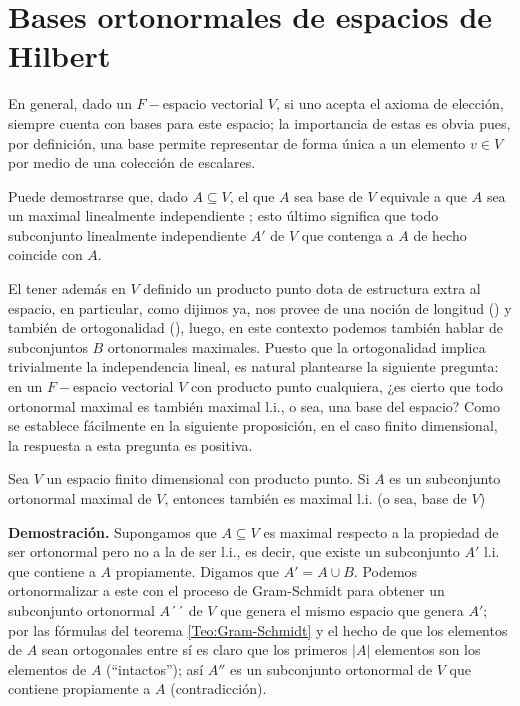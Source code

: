 \section{Bases ortonormales de espacios de Hilbert}





En general, dado un $F-$espacio vectorial $V$,
si uno acepta el axioma de elección, siempre cuenta con 
bases para este espacio; la importancia de 
estas es obvia pues, por definición, una base permite representar
de forma única a un elemento $v \in V$ por medio
de una colección de escalares. 


Puede demostrarse
que, dado $A \subseteq V$, el que $A$ sea base de $V$
equivale a que $A$ sea un maximal linealmente
independiente ; esto último significa
que todo subconjunto  linealmente
independiente $A'$ de $V$ que contenga
a $A$ de hecho coincide con $A$.

El tener además en $V$ definido un producto punto
dota de estructura extra al espacio, en particular, 
como dijimos ya,
nos provee de una noción de longitud () y también 
de ortogonalidad (), luego, en este 
contexto podemos también hablar de subconjuntos $B$
ortonormales maximales. Puesto que la ortogonalidad implica
trivialmente la independencia lineal, es natural plantearse
la siguiente pregunta: en un $F-$espacio vectorial $V$
con producto punto
cualquiera, ¿es cierto que todo ortonormal maximal es también
maximal l.i., o sea, una base
del espacio? Como se establece 
fácilmente en la siguiente proposición,
en el caso finito dimensional, la respuesta a esta
pregunta es positiva.

\begin{prop}
Sea $V$ un espacio finito dimensional
con producto punto. Si $A$
es un subconjunto ortonormal maximal de $V$, entonces
también es maximal l.i. (o sea, base de $V$)
\end{prop}
\noindent
\textbf{Demostración.}
Supongamos que $A \subseteq V$ es maximal 
respecto a la propiedad de ser ortonormal pero
no a la de ser l.i., es decir, que existe
un subconjunto $A'$ l.i. que contiene a $A$ propiamente.
Digamos que $A' = A \cup B$.
Podemos ortonormalizar a este con el proceso de Gram-Schmidt
para obtener un subconjunto ortonormal $A´´$ de
$V$ que genera 
el mismo espacio que genera $A'$;
por las fórmulas del teorema \ref{Teo:Gram-Schmidt}
y el hecho de que los elementos de $A$ sean ortogonales
entre sí es claro que los primeros $|A|$ elementos
son los elementos de $A$ (``intactos''); así $A''$
es un subconjunto ortonormal de $V$ que contiene propiamente
a $A$ (contradicción).
\QEDB
\vspace{0.2cm}

